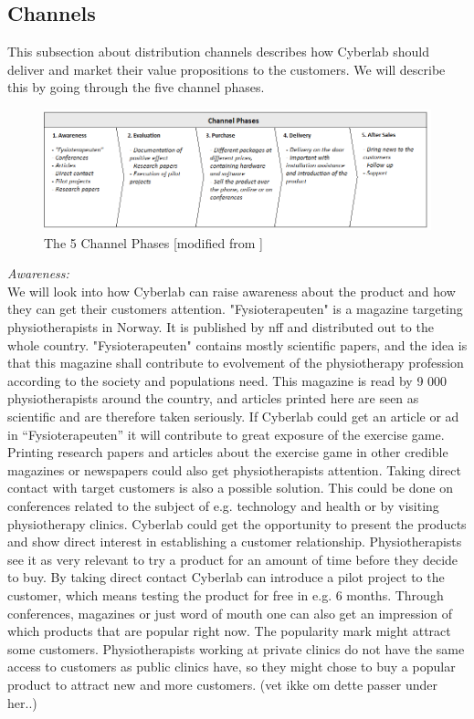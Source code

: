 \subsection{Channels}
This subsection about distribution channels describes how Cyberlab should deliver and market their value propositions to the customers. We will describe this by going through the five channel phases.
\begin{figure}
\label{fig:Channels}
\begin{center}
\includegraphics[angle=90,scale=0.7]{channels}
\caption[Channels]{The 5 Channel Phases [modified from \cite{osterwalder}\cite{osterwalderthesis}]}
\end{center}
\end{figure}
\emph{Awareness:} \\ 
We will look into how Cyberlab can raise awareness about the product and how they can get their customers attention.  "Fysioterapeuten" is a magazine targeting physiotherapists in Norway. It is published by \ac{nff} and distributed out to the whole country. "Fysioterapeuten" contains mostly scientific papers, and the idea is that this magazine shall contribute to evolvement of the physiotherapy profession according to the society and populations need. This magazine is read by 9 000 physiotherapists around the country, and articles printed here are seen as scientific and are therefore taken seriously. If Cyberlab could get an article or ad in “Fysioterapeuten” it will contribute to great exposure of the exercise game.  Printing research papers and articles about the exercise game in other credible magazines or newspapers could also get physiotherapists attention.  Taking direct contact with target customers is also a possible solution. This could be done on conferences related to the subject of e.g. technology and health or by visiting physiotherapy clinics. Cyberlab could get the opportunity to present the products and show direct interest in establishing a customer relationship. Physiotherapists see it as very relevant to try a product for an amount of time before they decide to buy. By taking direct contact Cyberlab can introduce a pilot project to the customer, which means testing the product for free in e.g. 6 months. Through conferences, magazines or just word of mouth one can also get an impression of which products that are popular right now. The popularity mark might attract some customers. Physiotherapists working at private clinics do not have the same access to customers as public clinics have, so they might chose to buy a popular product to attract new and more customers. (vet ikke om dette passer under her..)\\ \\ 
